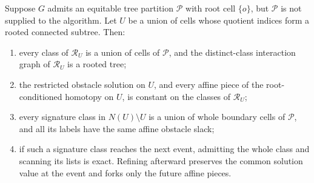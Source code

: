 \begin{lemma}
\label{lem:hidden-cell-refinement}
Suppose $G$ admits an equitable tree partition $\mathcal P$ with root cell
$\{o\}$, but $\mathcal P$ is not supplied to the algorithm.  Let $U$ be a
union of cells whose quotient indices form a rooted connected subtree.  Then:
\begin{enumerate}[label=(\roman*),leftmargin=*]
 \item every class of $\mathcal R_U$ is a union of cells of $\mathcal P$,
 and the distinct-class interaction graph of $\mathcal R_U$ is a rooted
 tree;
 \item the restricted obstacle solution on $U$, and every affine piece of
 the root-conditioned homotopy on $U$, is constant on the classes of
 $\mathcal R_U$;
 \item every signature class in $N(U)\setminus U$ is a union of whole
 boundary cells of $\mathcal P$, and all its labels have the same affine
 obstacle slack;
 \item if such a signature class reaches the next event, admitting the whole
 class and scanning its lists is exact.  Refining afterward preserves the
 common solution value at the event and forks only the future affine pieces.
\end{enumerate}
\end{lemma}

